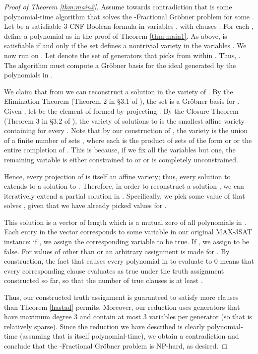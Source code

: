 \documentclass{article}
\begin{document}
\begin{proof}[Proof of Theorem \ref{thm:main2}]
Assume towards contradiction that  is some polynomial-time algorithm that solves the \nobreakdash-Fractional Gr\"obner problem for some .  Let  be a satisfiable 3\nobreakdash-CNF Boolean formula in variables , with clauses . For each , define a polynomial  as in the proof of Theorem \ref{thm:main1}. As above,  is satisfiable if and only if the set  defines a nontrivial variety in the variables . We now run  on . Let  denote the set of generators that  picks from within .  Thus, . The algorithm  must compute a Gr\"{o}bner basis  for the ideal generated by the polynomials in .

We claim that from  we can reconstruct a solution in the variety of .  By the Elimination Theorem (Theorem 2 in \S3.1 of \cite{cox}), the set  is a Gr\"obner basis for . Given , let  be the element of  formed by projecting . By the Closure Theorem (Theorem 3 in \S3.2 of \cite{cox}), the variety of solutions to  is the smallest affine variety containing  for every . Note that by our construction of , the variety  is the union of a finite number of sets , where each  is the product of sets of the form  or  or the entire completion of .  This is because, if we fix all the variables but one, the remaining variable is either constrained to  or  or is completely unconstrained.

Hence, every projection of  is itself an affine variety; thus, every solution to  extends to a solution to . Therefore, in order to reconstruct a solution , we can iteratively extend a partial solution in . Specifically, we pick some value of  that solves , given that we have already picked values for .

This solution  is a vector of length  which is a mutual zero of all polynomials in . Each entry in the vector corresponds to some variable in our original MAX\nobreakdash-3SAT instance: if , we assign the corresponding variable  to be true. If , we assign  to be false. For values of  other than  or  an arbitrary assignment is made for . By construction, the fact that  causes every polynomial in  to evaluate to 0 means that every corresponding clause evaluates as true under the truth assignment constructed so far, so that the number of true clauses is at least .

Thus, our constructed truth assignment is guaranteed to satisfy more clauses than Theorem \ref{hastad} permits.  Moreover, our reduction uses generators that have maximum degree 3 and contain at most 3 variables per generator (so that  is relatively sparse).  Since the reduction we have described is clearly polynomial-time (assuming that  is itself polynomial-time), we obtain a contradiction and conclude that the \nobreakdash-Fractional Gr\"obner problem is NP-hard, as desired. 
\end{proof}
\end{document}
